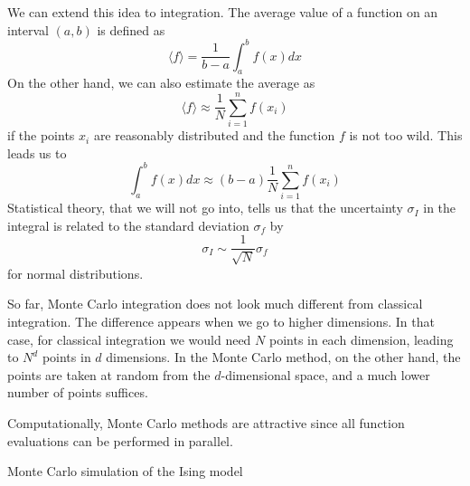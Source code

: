 We can extend this idea to integration. The average value of a
function on an interval $(a,b)$ is defined as
\[ \langle f\rangle = \frac1{b-a}\int_a^bf(x)dx \]
On the other hand, we can also estimate the average as
\[ \langle f\rangle \approx \frac 1N\sum_{i=1}^nf(x_i) \]
if the points $x_i$ are reasonably distributed and the function $f$ is
not too wild. This leads us to
\[ \int_a^bf(x)dx  \approx (b-a) \frac 1N\sum_{i=1}^nf(x_i) \]
Statistical theory, that we will not go into,
tells us that the uncertainty $\sigma_I$ in the integral is related to
the standard deviation $\sigma_f$ by
\[ \sigma_I\sim \frac1{\sqrt N}\sigma_f \]
for normal distributions.

So far, Monte Carlo integration does not look much different from
classical integration. The difference appears when we go to higher
dimensions. In that case, for classical integration we would need $N$
points in each dimension, leading to $N^d$ points in $d$
dimensions. In the Monte Carlo method, on the other hand, the points
are taken at random from the $d$-dimensional space, and a much lower
number of points suffices.

Computationally, Monte Carlo methods are attractive since all function
evaluations can be performed in parallel.

 {Monte Carlo simulation of the Ising model}
\label{sec:ising}



